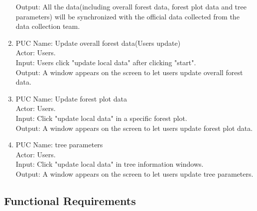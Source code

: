 \documentclass{article}
\begin{document}
\begin{enumerate}
    Output: All the data(including overall forest data, forest plot data and tree 
    parameters) will be synchronized with the official data collected from the 
    data collection team.
    \item PUC Name: Update overall forest data(Users update)\\
    Actor: Users.\\
    Input: Users click "update local data" after clicking "start".\\
    Output: A window appears on the screen to let users update overall
    forest data.
    \item PUC Name: Update forest plot data\\
    Actor: Users.\\
    Input: Click "update local data" in a specific forest plot.\\
    Output:  A window appears on the screen to let users update
    forest plot data.
    \item PUC Name: tree parameters\\
    Actor: Users.\\
    Input: Click "update local data" in tree information windows.\\
    Output:  A window appears on the screen to let users update tree 
    parameters.
\end{enumerate}



\subsection{Functional Requirements}
\end{document}
